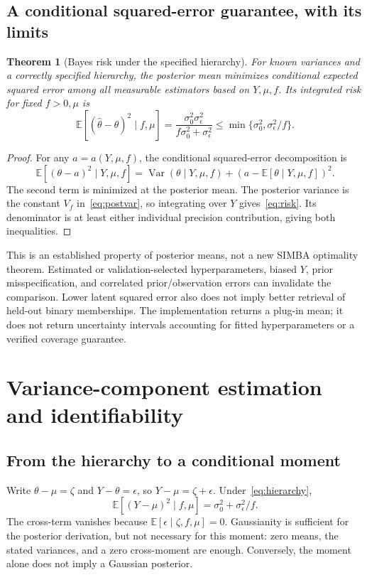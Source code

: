 \documentclass[11pt,a4paper]{article}
\newtheorem{theorem}{Theorem}[section]
\theoremstyle{remark}
\newcommand{\E}{\mathbb{E}}
\newcommand{\Var}{\operatorname{Var}}
\begin{document}
\subsection{A conditional squared-error guarantee, with its limits}
\begin{theorem}[Bayes risk under the specified hierarchy]
For known variances and a correctly specified hierarchy, the posterior
mean minimizes conditional expected squared error among all measurable
estimators based on $Y,\mu,f$. Its integrated risk for fixed $f>0,\mu$ is
\begin{equation}
 \E[(\widehat\theta-\theta)^2\mid f,\mu]
 =\frac{\sigma_0^2\sigma_\epsilon^2}{f\sigma_0^2+\sigma_\epsilon^2}
 \leq\min\{\sigma_0^2,\sigma_\epsilon^2/f\}.
 \label{eq:risk}
\end{equation}
\end{theorem}
\begin{proof}
For any $a=a(Y,\mu,f)$, the conditional squared-error decomposition is
\begin{equation}
 \E[(\theta-a)^2\mid Y,\mu,f]
 =\Var(\theta\mid Y,\mu,f)
   +(a-\E[\theta\mid Y,\mu,f])^2.
\end{equation}
The second term is minimized at the posterior mean. The posterior variance
is the constant $V_f$ in~\eqref{eq:postvar}, so integrating over $Y$
gives~\eqref{eq:risk}. Its denominator is at least either individual
precision contribution, giving both inequalities.
\end{proof}
This is an established property of posterior means, not a new SIMBA
optimality theorem. Estimated or validation-selected hyperparameters,
biased $Y$, prior misspecification, and correlated prior/observation errors
can invalidate the comparison. Lower latent squared error also does not
imply better retrieval of held-out binary memberships. The implementation
returns a plug-in mean; it does not return uncertainty intervals accounting
for fitted hyperparameters or a verified coverage guarantee.

\section{Variance-component estimation and identifiability}
\subsection{From the hierarchy to a conditional moment}
Write $\theta-\mu=\zeta$ and $Y-\theta=\epsilon$, so $Y-\mu=\zeta+\epsilon$.
Under~\eqref{eq:hierarchy},
\begin{equation}
 \E[(Y-\mu)^2\mid f,\mu]
 =\sigma_0^2+\sigma_\epsilon^2/f.
 \label{eq:moment}
\end{equation}
The cross-term vanishes because
$\E[\epsilon\mid\zeta,f,\mu]=0$.
Gaussianity is sufficient for the posterior derivation, but not necessary
for this moment: zero means, the stated variances, and a zero cross-moment
are enough. Conversely, the moment alone does not imply a Gaussian
posterior.
\end{document}
